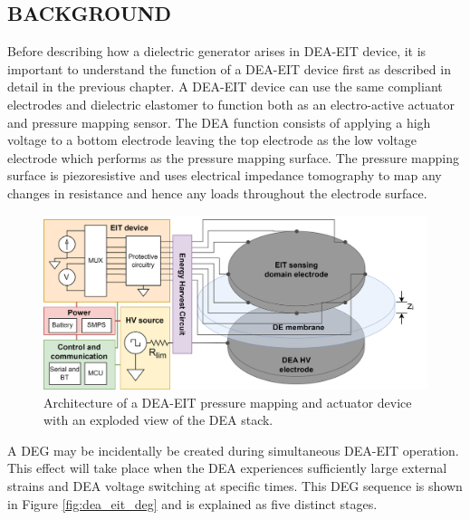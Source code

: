 \subsection{BACKGROUND} 
\label{subsec:background}
Before describing how a dielectric generator arises in DEA-EIT device, it is important to understand the function of a DEA-EIT device first as  described in detail in the previous chapter. A DEA-EIT device can use the same compliant electrodes and dielectric elastomer to function both as an electro-active actuator and pressure mapping sensor. The DEA function consists of applying a high voltage to a bottom electrode leaving the top electrode as the low voltage electrode which performs as the pressure mapping surface. The pressure mapping surface is piezoresistive and uses electrical impedance tomography to map any changes in resistance and hence any loads throughout the electrode surface. 
\begin{figure}[H]
	\centering
	\hspace{1cm}
	\includegraphics[width=0.9\linewidth]{Figures/DEA-EIT_architecture_v2.png}
	\vspace{0.3cm}
	\caption{Architecture of a DEA-EIT pressure mapping and actuator device with an exploded view of the DEA stack.}
	\label{fig:dea-eit-architecture-w-MCU}
\end{figure}

A DEG may be incidentally be created during simultaneous DEA-EIT operation. This effect will take place when the DEA experiences sufficiently large external strains and DEA voltage switching at specific times. This DEG sequence is shown in Figure \ref{fig:dea_eit_deg} and is explained as five distinct stages.

